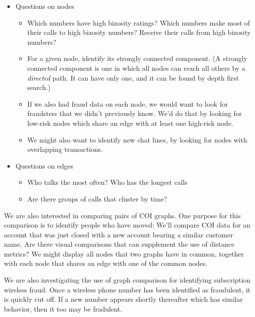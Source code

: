\documentclass[11pt]{article}
\begin{document}
\begin{itemize} \itemsep 0em
\item Questions on nodes

  \begin{itemize} \itemsep 0em
  \item Which numbers have high bizosity ratings?  Which numbers make
    most of their calls to high bizosity numbers?  Receive their calls
    from high bizosity numbers?
  \item For a given node, identify its strongly connected component. 
    (A strongly connected component is one in which all nodes can
    reach all others by a {\em directed} path.  It can have only one,
    and it can be found by depth first search.)
  \item If we also had fraud data on each node, we would want to look for
    fraudsters that we didn't previously know.  We'd do that by
    looking for low-risk nodes which share an edge with at least one
    high-risk node.
  \item We might also want to identify new chat lines, by looking for
    nodes with overlapping transactions.
  \end {itemize}

\item Questions on edges
  \begin{itemize} \itemsep 0em
  \item Who talks the most often?  Who has the longest calls
  \item Are there groups of calls that cluster by time?
  \end{itemize}

\end{itemize}

We are also interested in comparing pairs of COI graphs.  One
purpose for this comparison is to identify people who have moved:
We'll compare COI data for an account that was just closed
with a new account bearing a similar customer name.  Are there
visual comparisons that can supplement the use of distance
metrics?  We might display all nodes that two graphs have in
common, together with each node that shares an edge with
one of the common nodes.

We are also investigating the use of graph comparison for
identifying subscription wireless fraud.  Once a wireless phone
number has been identified as fraudulent, it is quickly cut off.
If a new number appears shortly thereafter which has similar
behavior, then it too may be fradulent.
\end{document}
